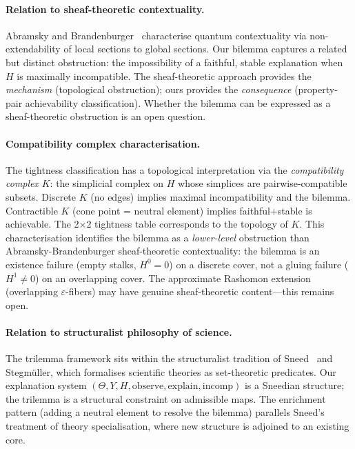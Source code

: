 \documentclass[11pt,a4paper]{article}
\begin{document}
\paragraph{Relation to sheaf-theoretic contextuality.}
Abramsky and Brandenburger~\citep{abramsky2011sheaf} characterise quantum contextuality via non-extendability of local sections to global sections. Our bilemma captures a related but distinct obstruction: the impossibility of a faithful, stable explanation when $H$ is maximally incompatible. The sheaf-theoretic approach provides the \emph{mechanism} (topological obstruction); ours provides the \emph{consequence} (property-pair achievability classification). Whether the bilemma can be expressed as a sheaf-theoretic obstruction is an open question.

\paragraph{Compatibility complex characterisation.}
The tightness classification has a topological interpretation via the \emph{compatibility complex} $K$: the simplicial complex on $H$ whose simplices are pairwise-compatible subsets. Discrete $K$ (no edges) implies maximal incompatibility and the bilemma. Contractible $K$ (cone point = neutral element) implies faithful+stable is achievable. The 2$\times$2 tightness table corresponds to the topology of $K$. This characterisation identifies the bilemma as a \emph{lower-level} obstruction than Abramsky-Brandenburger sheaf-theoretic contextuality: the bilemma is an existence failure (empty stalks, $H^0 = 0$) on a discrete cover, not a gluing failure ($H^1 \neq 0$) on an overlapping cover. The approximate Rashomon extension (overlapping $\varepsilon$-fibers) may have genuine sheaf-theoretic content---this remains open.

\paragraph{Relation to structuralist philosophy of science.}
The trilemma framework sits within the structuralist tradition of Sneed~\cite{sneed1971logical} and Stegm\"uller, which formalises scientific theories as set-theoretic predicates. Our explanation system $(\Theta, Y, H, \text{observe}, \text{explain}, \text{incomp})$ is a Sneedian structure; the trilemma is a structural constraint on admissible maps. The enrichment pattern (adding a neutral element to resolve the bilemma) parallels Sneed's treatment of theory specialisation, where new structure is adjoined to an existing core.
\end{document}
